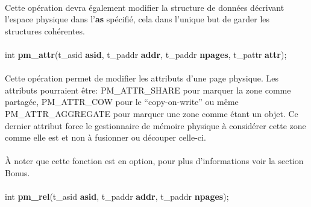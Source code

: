 \documentclass[10pt,a4wide]{article}
\begin{document}
\paragraph{}

Cette op\'eration devra \'egalement modifier la structure de donn\'ees
d\'ecrivant l'espace physique dans l'\textbf{as} sp\'ecifi\'e, cela
dans l'unique but de garder les structures coh\'erentes.

\paragraph{}


\hspace{1.5cm}int \textbf{pm\_attr}(t\_asid \textbf{asid},
                                    t\_paddr \textbf{addr},
                                    t\_paddr \textbf{npages},
                                    t\_pattr \textbf{attr});

\paragraph{}

Cette op\'eration permet de modifier les attributs d'une page physique.
Les attributs pourraient \^etre: PM\_ATTR\_SHARE pour marquer la zone
comme partag\'ee, PM\_ATTR\_COW pour le ``copy-on-write'' ou m\^eme
PM\_ATTR\_AGGREGATE pour marquer une zone comme \'etant un objet. Ce dernier
attribut force le gestionnaire de m\'emoire physique \`a consid\'erer
cette zone comme elle est et non \`a fusionner ou d\'ecouper celle-ci.

\paragraph{}

\`A noter que cette fonction est en option, pour plus d'informations voir
la section Bonus.

\paragraph{}

\hspace{1.5cm}int \textbf{pm\_rel}(t\_asid \textbf{asid},
                                   t\_paddr \textbf{addr},
                                   t\_paddr \textbf{npages});

\paragraph{}
\end{document}
